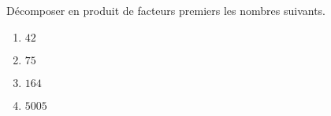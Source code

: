 
Décomposer en produit de facteurs premiers les nombres suivants.

\begin{enumerate}
\item $42$
\item $75$
\item $164$
\item $5005$
\end{enumerate}